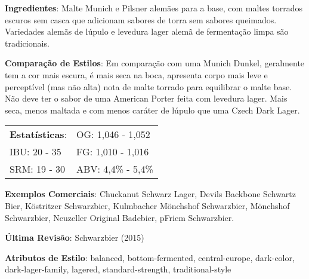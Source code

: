 \textbf{Ingredientes}: Malte Munich e Pilsner alemães para a base, com maltes torrados escuros sem casca que adicionam sabores de torra sem sabores queimados. Variedades alemãs de lúpulo e levedura lager alemã de fermentação limpa são tradicionais.

\textbf{Comparação de Estilos}: Em comparação com uma Munich Dunkel, geralmente tem a cor mais escura, é mais seca na boca, apresenta corpo mais leve e perceptível (mas não alta) nota de malte torrado para equilibrar o malte base. Não deve ter o sabor de uma American Porter feita com levedura lager. Mais seca, menos maltada e com menos caráter de lúpulo que uma Czech Dark Lager.

\begin{tabular}{@{}p{35mm}p{35mm}@{}}
  \textbf{Estatísticas}: & OG: 1,046 - 1,052 \\
  IBU: 20 - 35 & FG: 1,010 - 1,016 \\
  SRM: 19 - 30 & ABV: 4,4\% - 5,4\%
\end{tabular}

\textbf{Exemplos Comerciais}: Chuckanut Schwarz Lager, Devils Backbone Schwartz Bier, Köstritzer Schwarzbier, Kulmbacher Mönchshof Schwarzbier, Mönchshof Schwarzbier, Neuzeller Original Badebier, pFriem Schwarzbier.

\textbf{Última Revisão}: Schwarzbier (2015)

\textbf{Atributos de Estilo}: balanced, bottom-fermented, central-europe, dark-color, dark-lager-family, lagered, standard-strength, traditional-style
